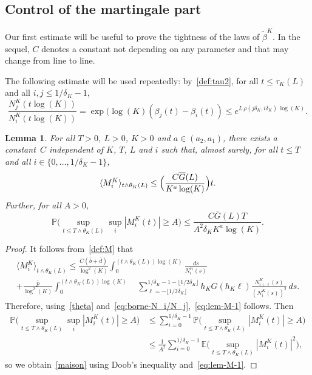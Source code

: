 \documentclass[JEP,XML,SOM,Unicode,published]{cedram}
\theoremstyle{plain}
\newtheorem{lemma}[theorem]{Lemma}
\theoremstyle{remark}
\begin{document}
\subsection{Control of the martingale part}\label{sec:control-martingale}

Our first estimate will be useful to prove the tightness of the laws of $\widetilde{\beta}^K$. In the sequel, $C$ denotes a constant not depending on any parameter and that may change from line to line.

The following estimate will be used repeatedly: by~\eqref{def:tau2}, for all $t\leq\tau_K(L)$ and all $i,j\leq 1/\delta_K-1$,
\begin{equation}
\label{eq:borne-N_i/N_j}
\frac{N^K_j(t\log(K))}{N^K_{i}(t\log(K))} = \exp(\log(K) (\beta_{j}(t)-\beta_{i}(t)) \le e^{ L\, \rho(j \delta_K,i \delta_K)\, \log(K) }.
\end{equation}

\begin{lemma}
\label{lem:M}
For all $T>0$, $L>0$, $K>0$ and $a\in (a_2,a_1)$, there exists a constant~$C$ independent of $K$, $T$, $L$ and $i$ such that, almost surely, for all $t\leq T$ and all $i\in\{0,\ldots,1/\delta_K-1\}$,
\begin{equation}
\label{eq:lem-M-1}
\langle M^K_i\rangle_{t\wedge\theta_K(L)}\leq \Bigl(\frac{C\overline{G}(L)}{K^a\log(K)}\Bigr)t.
\end{equation}
Further, for all $A>0$,
\begin{equation}
\label{maison}
\mathbb{P}\Big(\sup_{t\le T\wedge \theta_{K}(L)}\sup_{i}|M^K_i(t)|\geq A\Big)\leq\frac{C\overline{G}(L)T}{A^2\delta_K K^a\log(K)}.
\end{equation}
\end{lemma}

\begin{proof}
It follows from~\eqref{def:M} that
\begin{multline*}
\langle M^K_i\rangle_{t\wedge\theta_K(L)} \leq \frac{C(\bar b+\bar d)}{\log^2 (K)}\int_0^{(t\wedge \theta_K(L))\log(K)}\frac{ds}{N^K_i(s)}\\
+\frac{\bar p}{\log^2 (K)}\int_0^{(t\wedge\theta_K(L))\log(K)}\quad
\sum_{\ell=-\lfloor 1/2\delta_K\rfloor}^{1/\delta_K-1-\lfloor 1/2\delta_K\rfloor}
h_{K} G(h_{K}\ell)\frac{N^K_{i+\ell}(s)}{(N^K_{i}(s))^2}\,ds.
\end{multline*}
Therefore, using~\eqref{theta} and~\eqref{eq:borne-N_i/N_j},~\eqref{eq:lem-M-1} follows. Then
\begin{align*}
\mathbb{P}\Big(\sup_{t\le T\wedge \theta_{K}(L)}\sup_{i}|M^K_i(t)|\geq A\Big) & \leq\sum_{i=0}^{1/\delta_K-1}\mathbb{P}\Big(\sup_{t\le T\wedge \theta_{K}(L)}|M^K_i(t)|\geq A\Big) \\ & \leq \frac{1}{A^2}\sum_{i=0}^{1/\delta_K-1}\mathbb{E}\Big(\sup_{t\le T\wedge \theta_{K}(L)}|M^K_i(t)|^2\Big),
\end{align*}
so we obtain~\eqref{maison} using Doob's inequality and~\eqref{eq:lem-M-1}.
\end{proof}
\end{document}
